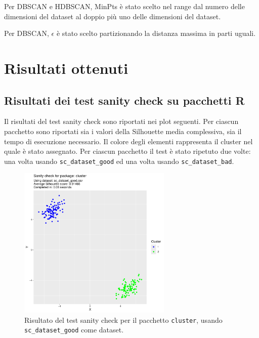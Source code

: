 \documentclass[a4paper, 12pt]{report}
\begin{document}
			Per DBSCAN e HDBSCAN, MinPts è stato scelto nel range dal numero delle
			dimensioni del dataset al doppio più uno delle dimensioni del dataset.

			Per DBSCAN, $\epsilon$ è stato scelto partizionando la distanza massima
			in parti uguali.

	\chapter{Risultati ottenuti}

		\section{Risultati dei test sanity check su pacchetti R}

			Il risultati del test sanity check sono riportati nei plot
			seguenti. Per ciascun pacchetto sono riportati sia i valori
			della Silhouette media complessiva, sia il tempo di esecuzione
			necessario. Il colore degli elementi rappresenta il cluster
			nel quale è stato assegnato. Per ciascun pacchetto il test
			è stato ripetuto due volte: una volta usando \texttt{sc\_dataset\_good}
			ed una volta usando \texttt{sc\_dataset\_bad}.

			\begin{figure}[H]
				\centering
				\includegraphics[width = 0.65\textwidth, page = 1]{results/results_CLUSTER.pdf}
				\caption{Risultato del test sanity check per il pacchetto \texttt{cluster}, usando \texttt{sc\_dataset\_good} come dataset.}
				\label{fig:clustergood}
			\end{figure}
\end{document}
